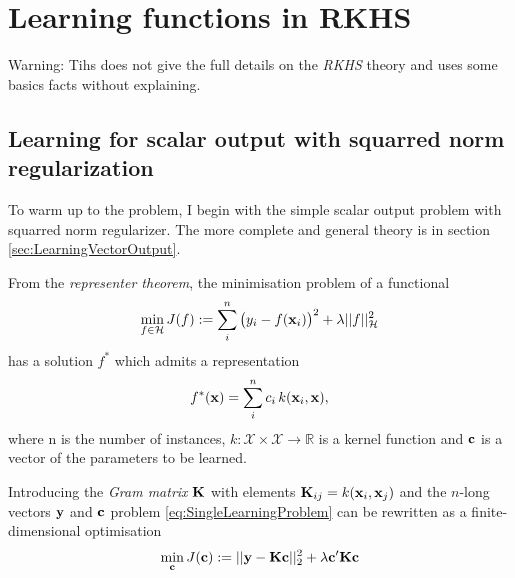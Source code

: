 
\clearpage

\section{Learning functions in RKHS}\label{sec:RKHS}

Warning: Tihs does not give the full details on the \emph{RKHS} theory and uses some basics facts without explaining.

\subsection{Learning for scalar output with squarred norm regularization}\label{sec:RKHSScalar}

To warm up to the problem, I begin with the simple scalar output problem with squarred norm regularizer.
The more complete and general theory is in section \ref{sec:LearningVectorOutput}.

From the \emph{representer theorem}, the minimisation problem of a functional
\begin{equation}\label{eq:SingleLearningProblem}
 \min_{f \in \mathcal{H}} J(f):= \sum_i^n \big( y_i - f(\mathbf{x}_i) \big)^2 + \lambda ||f||_\mathcal{H}^2 
\end{equation}
has a solution $f^*$ which admits a representation 
\begin{equation}\label{eq:RepresenterMinimizer}
 f^*(\mathbf{x}) = \sum_i^n c_i \, k(\mathbf{x}_i,\mathbf{x}),
\end{equation}
where n is the number of instances, $k: \mathcal{X} \times \mathcal{X}
\rightarrow \mathbb{R}$ is a kernel function and $\mathbf{c}$ is a vector of the
parameters to be learned.

Introducing the \emph{Gram matrix} $\mathbf{K}$ with elements $\mathbf{K}_{ij} =
k(\mathbf{x}_i,\mathbf{x}_j)$ and the $n$-long vectors $\mathbf{y}$ and $\mathbf{c}$ problem \eqref{eq:SingleLearningProblem} can be rewritten as a finite-dimensional optimisation
\begin{equation}\label{eq:SingleLearningProblem2}
 \min_{\mathbf{c}} J(\mathbf{c}):= ||\mathbf{y} - \mathbf{K} \mathbf{c}||_2^2 +
\lambda \mathbf{c}' \mathbf{K} \mathbf{c}
\end{equation}

